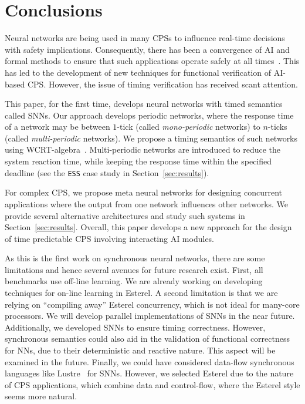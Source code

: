 \section{Conclusions}
\label{sec:conclusions}

Neural networks are being used in many \acfp{CPS} to influence
real-time decisions with safety implications. Consequently, there has
been a convergence of AI and formal methods to ensure that such
applications operate safely at all times~\cite{seshia2016towards}. This has led to the development of new
techniques for functional verification of AI-based \ac{CPS}. However,
the issue of timing verification has received scant attention. 

This paper, for the first time, develops neural networks with timed
semantics called \acfp{SNN}. Our approach develops periodic networks,
where the response time of a network may be between $1$-tick (called
\emph{mono-periodic} networks) to $n$-ticks (called
\emph{multi-periodic} networks). We propose a timing semantics of such
networks using \ac{WCRT}-algebra~\cite{wang2017timing}. Multi-periodic networks are
introduced to reduce the system reaction time, while keeping the
response time within the specified deadline (see the \texttt{ESS} case
study in Section~\ref{sec:results}). 

For complex CPS, we propose meta neural networks for designing concurrent applications where the output from
one network influences other networks. We provide several alternative
architectures and study such systems in
Section~\ref{sec:results}. Overall, this paper develops a new approach
for the design of time predictable \acf{CPS} involving interacting 
AI modules.

As this is the first work on synchronous neural networks,
there are some limitations and hence several avenues
for future research exist. First, all benchmarks use off-line learning. We are already
working on developing techniques for on-line learning in Esterel. A
second limitation is that we are relying on ``compiling away'' Esterel
concurrency, which is not ideal for many-core processors. We will develop parallel implementations
of \acp{SNN} in the near future. 
Additionally, we developed \acp{SNN} to ensure timing correctness. 
However, synchronous semantics could also aid in the
validation of functional correctness for \acp{NN}, due to their
deterministic and reactive nature. This aspect will be examined in the future.
Finally, we could have considered
data-flow synchronous languages like Lustre~\cite{benveniste2003synchronous} for
\acp{SNN}. However, we selected Esterel due to the nature of \ac{CPS}
applications, which combine data and control-flow, where the Esterel
style seems more natural.